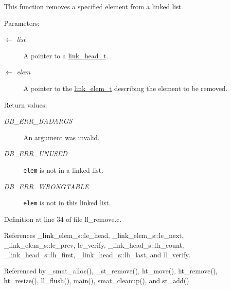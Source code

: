 This function removes a specified element from a linked list.

\begin{Desc}
\item[Parameters:]
\begin{description}
\item[\mbox{$\leftarrow$} {\em list}]A pointer to a \hyperlink{group__dbprim__link_ga0}{link\_\-head\_\-t}. \item[\mbox{$\leftarrow$} {\em elem}]A pointer to the \hyperlink{group__dbprim__link_ga1}{link\_\-elem\_\-t} describing the element to be removed.\end{description}
\end{Desc}
\begin{Desc}
\item[Return values:]
\begin{description}
\item[{\em DB\_\-ERR\_\-BADARGS}]An argument was invalid. \item[{\em DB\_\-ERR\_\-UNUSED}]{\tt elem} is not in a linked list. \item[{\em DB\_\-ERR\_\-WRONGTABLE}]{\tt elem} is not in this linked list.\end{description}
\end{Desc}


Definition at line 34 of file ll\_\-remove.c.

References \_\-link\_\-elem\_\-s::le\_\-head, \_\-link\_\-elem\_\-s::le\_\-next, \_\-link\_\-elem\_\-s::le\_\-prev, le\_\-verify, \_\-link\_\-head\_\-s::lh\_\-count, \_\-link\_\-head\_\-s::lh\_\-first, \_\-link\_\-head\_\-s::lh\_\-last, and ll\_\-verify.

Referenced by \_\-smat\_\-alloc(), \_\-st\_\-remove(), ht\_\-move(), ht\_\-remove(), ht\_\-resize(), ll\_\-flush(), main(), smat\_\-cleanup(), and st\_\-add().